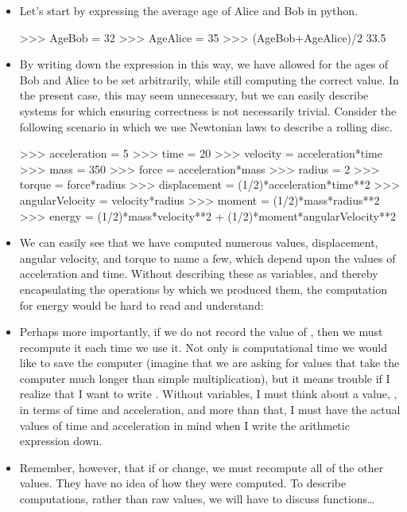 \begin{itemize}
    \item Let's start by expressing the average age of Alice and Bob in python.
\begin{codeblock}
>>> AgeBob = 32
>>> AgeAlice = 35
>>> (AgeBob+AgeAlice)/2
33.5
\end{codeblock}
    \item By writing down the expression in this way, we have allowed for the ages of Bob and Alice to be set arbitrarily, while still computing the correct value.
        In the present case, this may seem unnecessary, but we can easily describe systems for which ensuring correctness is not necessarily trivial.
        Consider the following scenario in which we use Newtonian laws to describe a rolling disc.
\begin{codeblock}
>>> acceleration = 5
>>> time = 20
>>> velocity = acceleration*time
>>> mass = 350
>>> force = acceleration*mass
>>> radius = 2
>>> torque = force*radius
>>> displacement = (1/2)*acceleration*time**2
>>> angularVelocity = velocity*radius
>>> moment = (1/2)*mass*radius**2
>>> energy = (1/2)*mass*velocity**2 + (1/2)*moment*angularVelocity**2
\end{codeblock}
    \item We can easily see that we have computed numerous values, displacement, angular velocity, and torque to name a few, which depend upon the values of acceleration and time.
        Without describing these as variables, and thereby encapsulating the operations by which we produced them, the computation for energy would be hard to read and understand:
    \item Perhaps more importantly, if we do not record the value of , then we must recompute it each time we use it.
        Not only is computational time we would like to save the computer (imagine that we are asking for values that take the computer much longer than simple multiplication), but it means trouble if I realize that I want to write .
        Without variables, I must think about a value, , in terms of time and acceleration, and more than that, I must have the actual values of time and acceleration in mind when I write the arithmetic expression down.
    \item Remember, however, that if  or  change, we must recompute all of the other values.
        They have no idea of how they were computed.
        To describe computations, rather than raw values, we will have to discuss functions\ldots
\end{itemize}

